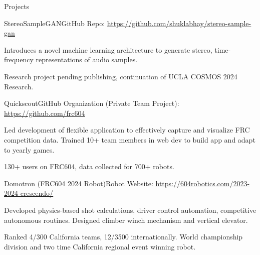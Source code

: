 \documentclass[
  11pt, %
]{public/resume/resume} %
\begin{document}

\begin{rSection}{Projects}

  
  \begin{rSubsection}{StereoSampleGAN}{}{GitHub Repo: \underline{\href{https://github.com/shuklabhay/stereo-sample-gan}{https://github.com/shuklabhay/stereo-sample-gan}}}{}
       
    \item Introduces a novel machine learning architecture to generate stereo, time-frequency representations of audio samples.
        
    \item Research project pending publishing, continuation of UCLA COSMOS 2024 Research.
        
  \end{rSubsection}
      
  \begin{rSubsection}{Quickscout}{}{GitHub Organization (Private Team Project): \underline{\href{https://github.com/frc604}{https://github.com/frc604}}}{}
       
    \item Led development of flexible application to effectively capture and visualize FRC competition data. Trained 10+ team members in web dev to build app and adapt to yearly games.
        
    \item 130+ users on FRC604, data collected for 700+ robots.
        
  \end{rSubsection}
      
  \begin{rSubsection}{Domotron (FRC604 2024 Robot)}{}{Robot Website: \underline{\href{https://604robotics.com/2023-2024-crescendo/}{https://604robotics.com/2023-2024-crescendo/}}}{}
       
    \item Developed physics-based shot calculations, driver control automation, competitive autonomous routines. Designed climber winch mechanism and vertical elevator.
        
    \item Ranked 4/300 California teams, 12/3500 internationally. World championship division and two time California regional event winning robot.
        

\end{rSubsection}
\end{rSection}
\end{document}
